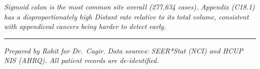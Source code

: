 \documentclass[11pt, a4paper]{article}
\begin{document}
\noindent\textit{Sigmoid colon is the most common site overall (277,634 cases). Appendix (C18.1) has a disproportionately high Distant rate relative to its total volume, consistent with appendiceal cancers being harder to detect early.}

\vspace{10pt}

\noindent\rule{\linewidth}{0.4pt}
\noindent\small \textit{Prepared by Rohit for Dr.\ Cagir. Data sources: SEER*Stat (NCI) and HCUP NIS (AHRQ). All patient records are de-identified.}
\end{document}
